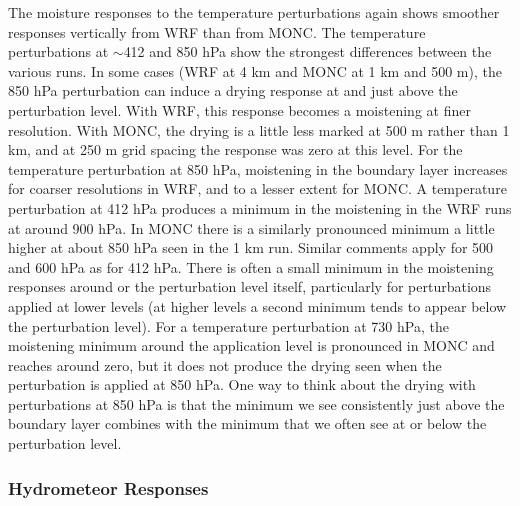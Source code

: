 \documentclass[draft]{agujournal2019}
\begin{document}
The moisture responses to the temperature perturbations again shows smoother
responses vertically from WRF than from MONC. The temperature perturbations at
$\sim$412 and 850 hPa show the strongest differences between the various runs.
In some cases (WRF at 4 km and MONC at 1 km and 500 m), the 850 hPa perturbation
can induce a drying response at and just above the perturbation level. With WRF,
this response becomes a moistening at finer resolution. With MONC, the drying is
a little less marked at 500 m rather than 1 km, and at 250 m grid spacing the
response was zero at this level. For the temperature perturbation at 850 hPa,
moistening in the boundary layer increases for coarser resolutions in WRF, and
to a lesser extent for MONC. A temperature perturbation at 412 hPa produces a
minimum in the moistening in the WRF runs at around 900 hPa. In MONC there is a
similarly pronounced minimum a little higher at about 850 hPa seen in the 1 km
run. Similar comments apply for 500 and 600 hPa as for 412 hPa. There is often a
small minimum in the moistening responses around or the perturbation level
itself, particularly for perturbations applied at lower levels (at higher levels
a second minimum tends to appear below the perturbation level). For a
temperature perturbation at 730 hPa, the moistening minimum around the
application level is pronounced in MONC and reaches around zero, but it does not
produce the drying seen when the perturbation is applied at 850 hPa. One way to
think about the drying with perturbations at 850 hPa is that the minimum we see
consistently just above the boundary layer combines with the minimum that we
often see at or below the perturbation level.

\subsubsection{Hydrometeor Responses}
\end{document}
